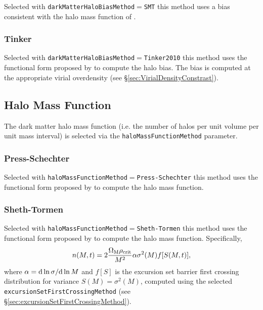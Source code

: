 Selected with {\tt darkMatterHaloBiasMethod}$=${\tt SMT} this method uses a bias consistent with the halo mass function of \cite{sheth_ellipsoidal_2001}.

\subsubsection{Tinker}

Selected with {\tt darkMatterHaloBiasMethod}$=${\tt Tinker2010} this method uses the functional form proposed by \cite{tinker_large_2010} to compute the halo bias. The bias is computed at the appropriate virial overdensity (see \S\ref{sec:VirialDensityConstrast}).

\subsection{Halo Mass Function}

The dark matter halo mass function (i.e. the number of halos per unit volume per unit mass interval) is selected via the {\tt haloMassFunctionMethod} parameter.

\subsubsection{Press-Schechter}

Selected with {\tt haloMassFunctionMethod}$=${\tt Press-Schechter} this method uses the functional form proposed by \cite{press_formation_1974} to compute the halo mass function.

\subsubsection{Sheth-Tormen}

Selected with {\tt haloMassFunctionMethod}$=${\tt Sheth-Tormen} this method uses the functional form proposed by \cite{sheth_ellipsoidal_2001} to compute the halo mass function. Specifically,
\begin{equation}
n(M,t) = 2 {\Omega_{\rm M} \rho_{\rm crit} \over M^2} \alpha \sigma^2(M) f[S(M,t)],
\end{equation}
where $\alpha = {\rm d}\ln\sigma/{\rm d}\ln M$ and $f[S]$ is the excursion set barrier first crossing distribution for variance $S(M)=\sigma^2(M)$, computed using the selected {\tt excursionSetFirstCrossingMethod} (see \S\ref{sec:excursionSetFirstCrossingMethod}).

